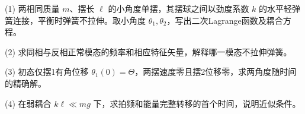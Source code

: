(1) 两相同质量 \(m\)、摆长 \(\ell\) 的小角度单摆，其摆球之间以劲度系数 \(k\) 的水平轻弹簧连接，平衡时弹簧不拉伸。取小角度 \(\theta_1,\theta_2\)，写出二次Lagrange函数及耦合方程。

(2) 求同相与反相正常模态的频率和相应特征矢量，解释哪一模态不拉伸弹簧。

(3) 初态仅摆1有角位移 \(\theta_1(0)=\Theta\)，两摆速度零且摆2位移零，求两角度随时间的精确解。

(4) 在弱耦合 \(k\ell\ll mg\) 下，求拍频和能量完整转移的首个时间，说明近似条件。
